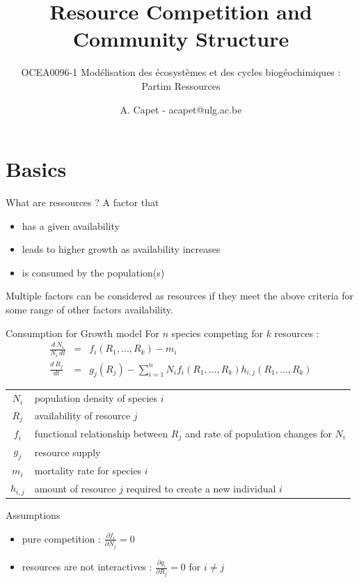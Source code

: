 \documentclass[final,xcolor=dvipsnames]{beamer}
\title[Resource Competition]{Resource Competition and Community Structure}
\subtitle{OCEA0096-1 	Modélisation des écosystèmes et des cycles biogéochimiques : Partim Ressources}
\author[A. Capet]{A. Capet - acapet@ulg.ac.be} %
\institute[http://labos.ulg.ac.be/mast/]{MAST}
\date[2017-2018]
\begin{document}

\begin{frame}
  \titlepage
\end{frame}



\section{Basics}

\begin{frame}{What are ressources ?}
 A factor that
 \begin{itemize}
 \item has a given availability
 \item leads to higher growth as availability increases
 \item is consumed by the population(s)
 \end{itemize}
 Multiple factors can be considered as resources if they meet the above criteria for some range of other factors availability.
\end{frame}

\begin{frame}{Consumption for Growth model}
For $n$ species competing for $k$ resources :
  \begin{eqnarray}
  \frac{d~N_i}{N_i~dt}&=&f_i(R_1,...,R_k) - m_i \\
  \frac{d~R_j}{dt}&=&g_j(R_j)-\sum\limits_{i=1}^n N_i f_i(R_1,...,R_k) h_{i,j}(R_1,...,R_k)
  \end{eqnarray}
  \begin{tabular}{c p{10cm}}
  $N_i$ & population density of species $i$\\
  $R_j$ & availability of resource $j$ \\
  $f_i$ & functional relationship between $R_j$ and rate of population changes for $N_i$ \\
  $g_j$ & resource supply \\
  $m_i$ & mortality rate for species $i$ \\
  $h_{i,j}$ & amount of resource $j$ required to create a new individual $i$
  \end{tabular}
\end{frame}


\begin{frame}{Assumptions}
\begin{itemize}
\item pure competition : $\frac{\partial f_i}{\partial N_j}=0$
\item resources are not interactives : $\frac{\partial g_i}{\partial R_j}=0$ for $i\neq j$
\end{itemize}
\end{frame}
\end{document}
